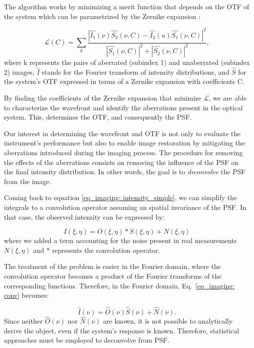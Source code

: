 The algorithm works by minimizing a merit function that depends on the OTF of the system which can be parametrized by the Zernike expansion \citep{pd_cost}: 

\begin{equation}
  \mathcal{L} (C) = \sum _ {k} \frac{|\hat{I_1} (\nu ) \hat{S_2} (\nu , C) - \hat{I_2}(u) \hat{S_1}(\nu , C)| ^2}{|\hat{S_1}(\nu , C)| ^2 + |\hat{S_2}(\nu , C)| ^2} , 
\end{equation}
where k represents the pairs of aberrated (subindex 1) and unaberrated (subindex 2) images, $\hat{I}$ stands for the Fourier transform of intensity distributions, and $\hat{S}$ for the system's OTF expressed in terms of a Zernike expansion with coefficients C. 

By finding the coefficients of the Zernike expansion that minimize $\mathcal{L}$, we are able to characterize the wavefront and identify the aberrations present in the optical system. This, determines the OTF, and consequently the PSF.

Our interest in determining the wavefront and OTF is not only to evaluate the instrument's performance but also to enable image restoration by mitigating the aberrations introduced during the imaging process. The procedure for removing the effects of the aberrations consists on removing the influence of the PSF on the final intensity distribution. In other words, the goal is to \textit{deconvolve} the PSF from the image.

Coming back to equation \eqref{eq_imaging: intensity_simple}, we can simplify the integrals to a convolution operator assuming an spatial invariance of the PSF. In that case, the observed intensity can be expressed by:

\begin{equation}
  I(\xi, \eta) = O(\xi, \eta) * S(\xi, \eta) + N (\xi, \eta)
  \label{eq_imaging: conv} 
\end{equation}  
where we added a term accounting for the noise present in real measurements $N (\xi, \eta)$ and $ * $ represents the convolution operator. 

The treatment of the problem is easier in the Fourier domain, where the convolution operator becomes a product of the Fourier transforms of the corresponding functions. Therefore, in the Fourier domain, Eq.~\ref{eq_imaging: conv} becomes: 

\begin{equation}
  \hat{I}(\nu ) = \hat{O}(\nu)\hat{S}(\nu)+\hat{N}(\nu).
\end{equation}
Since neither $\hat{O}(\nu)$ nor $\hat{N}(\nu)$ are known, it is not possible to analytically derive the object, even if the system's response is known. Therefore, statistical approaches must be employed to deconvolve from PSF.

